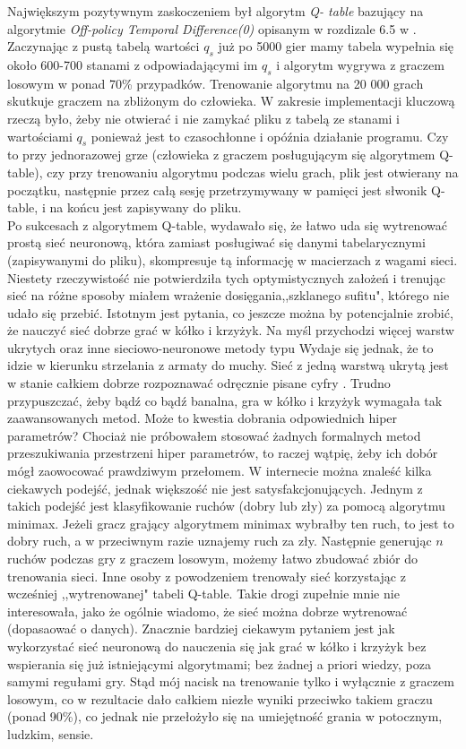 \documentclass[licencjacka]{pracamgr}
\begin{document}
Największym pozytywnym zaskoczeniem był algorytm  \textit{Q- table} bazujący na algorytmie \textit{Off-policy Temporal Difference(0)} opisanym w rozdizale 6.5 w \cite{RL}. Zaczynając z pustą tabelą wartości $q_{s}$ już po 5000 gier mamy tabela wypełnia się około 600-700 stanami z odpowiadającymi im $q_{s}$ i algorytm wygrywa z graczem losowym w ponad 70\% przypadków. Trenowanie algorytmu na 20 000 grach skutkuje graczem na zbliżonym do człowieka. W zakresie implementacji kluczową rzeczą było, żeby nie otwierać i nie zamykać pliku z  tabelą  ze stanami i wartościami $q_{s}$ ponieważ jest to czasochłonne i opóźnia działanie programu. Czy to przy  jednorazowej grze (człowieka z graczem posługującym się algorytmem Q-table), czy przy trenowaniu algorytmu podczas wielu grach,  plik jest otwierany na początku, następnie przez całą sesję przetrzymywany w pamięci jest słwonik Q-table, i na końcu jest zapisywany do pliku.\\ 

Po sukcesach z algorytmem Q-table, wydawało się, że łatwo uda się wytrenować prostą sieć neuronową, która zamiast posługiwać się danymi tabelarycznymi (zapisywanymi do pliku), skompresuje tą informację w macierzach z wagami sieci. Niestety rzeczywistość nie potwierdziła tych optymistycznych założeń i trenując sieć na różne sposoby miałem wrażenie dosięgania,,szklanego sufitu", którego nie udało się przebić. Istotnym jest pytania, co jeszcze można by potencjalnie zrobić, że nauczyć sieć dobrze grać w kółko i krzyżyk.  Na myśl przychodzi więcej warstw ukrytych oraz inne sieciowo-neuronowe metody typu    Wydaje się jednak, że to idzie w kierunku strzelania z armaty do muchy. Sieć z jedną warstwą ukrytą jest w stanie całkiem dobrze rozpoznawać odręcznie pisane cyfry \cite{nn}. Trudno przypuszczać, żeby bądź co bądź banalna, gra w kółko i krzyżyk wymagała tak zaawansowanych metod. Może to kwestia dobrania odpowiednich hiper parametrów? Chociaż nie próbowałem stosować żadnych formalnych metod przeszukiwania przestrzeni hiper parametrów, to raczej wątpię, żeby ich dobór mógł zaowocować prawdziwym przełomem.  W internecie można znaleść kilka ciekawych podejść, jednak większość  nie jest satysfakcjonujących. Jednym z takich podejść jest klasyfikowanie ruchów (dobry lub zły) za pomocą algorytmu minimax. Jeżeli gracz grający algorytmem minimax wybrałby ten ruch, to jest to dobry ruch, a w przeciwnym razie uznajemy ruch za zły. Następnie generując $n$ ruchów podczas gry z graczem losowym, możemy łatwo zbudować zbiór do trenowania sieci. Inne osoby z powodzeniem trenowały sieć korzystając z wcześniej ,,wytrenowanej" tabeli Q-table.  Takie drogi zupełnie mnie nie interesowała, jako że ogólnie wiadomo, że sieć można dobrze wytrenować (dopasaować o danych). Znacznie bardziej ciekawym pytaniem jest jak wykorzystać sieć neuronową do nauczenia się  jak grać w kółko i krzyżyk bez wspierania się już istniejącymi algorytmami; bez żadnej a priori wiedzy, poza samymi regułami gry. Stąd mój nacisk na trenowanie tylko i wyłącznie z graczem losowym, co w rezultacie dało całkiem niezłe wyniki przeciwko takiem graczu (ponad 90\%), co jednak nie przełożyło się na umiejętność grania w potocznym, ludzkim, sensie. \\
\end{document}
